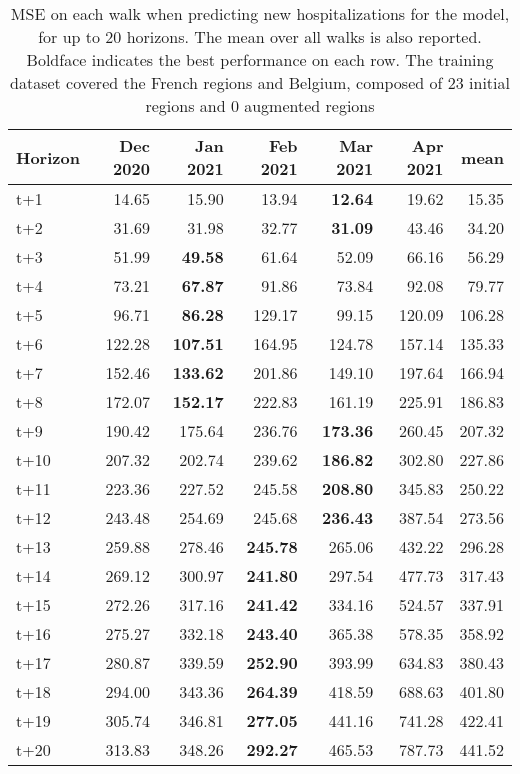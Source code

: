 \begin{table}[H]
\centering
\caption{MSE on each walk when predicting new hospitalizations for the model, for up to 20 horizons. The mean over all walks is also reported. Boldface indicates the best performance on each row. The training dataset covered the French regions and Belgium, composed of 23 initial regions and 0 augmented regions }
\label{tab:MSE_walk_baseline}
\begin{tabular}{lrrrrrr}
\toprule
Horizon &  Dec 2020 &  Jan 2021 &  Feb 2021 &  Mar 2021 &  Apr 2021 &   mean \\
\midrule
t+1  & 14.65  & 15.90  & 13.94  & \textbf{12.64}  & 19.62  & 15.35  \\
t+2  & 31.69  & 31.98  & 32.77  & \textbf{31.09}  & 43.46  & 34.20  \\
t+3  & 51.99  & \textbf{49.58}  & 61.64  & 52.09  & 66.16  & 56.29  \\
t+4  & 73.21  & \textbf{67.87}  & 91.86  & 73.84  & 92.08  & 79.77  \\
t+5  & 96.71  & \textbf{86.28}  & 129.17  & 99.15  & 120.09  & 106.28  \\
t+6  & 122.28  & \textbf{107.51}  & 164.95  & 124.78  & 157.14  & 135.33  \\
t+7  & 152.46  & \textbf{133.62}  & 201.86  & 149.10  & 197.64  & 166.94  \\
t+8  & 172.07  & \textbf{152.17}  & 222.83  & 161.19  & 225.91  & 186.83  \\
t+9  & 190.42  & 175.64  & 236.76  & \textbf{173.36}  & 260.45  & 207.32  \\
t+10  & 207.32  & 202.74  & 239.62  & \textbf{186.82}  & 302.80  & 227.86  \\
t+11  & 223.36  & 227.52  & 245.58  & \textbf{208.80}  & 345.83  & 250.22  \\
t+12  & 243.48  & 254.69  & 245.68  & \textbf{236.43}  & 387.54  & 273.56  \\
t+13  & 259.88  & 278.46  & \textbf{245.78}  & 265.06  & 432.22  & 296.28  \\
t+14  & 269.12  & 300.97  & \textbf{241.80}  & 297.54  & 477.73  & 317.43  \\
t+15  & 272.26  & 317.16  & \textbf{241.42}  & 334.16  & 524.57  & 337.91  \\
t+16  & 275.27  & 332.18  & \textbf{243.40}  & 365.38  & 578.35  & 358.92  \\
t+17  & 280.87  & 339.59  & \textbf{252.90}  & 393.99  & 634.83  & 380.43  \\
t+18  & 294.00  & 343.36  & \textbf{264.39}  & 418.59  & 688.63  & 401.80  \\
t+19  & 305.74  & 346.81  & \textbf{277.05}  & 441.16  & 741.28  & 422.41  \\
t+20  & 313.83  & 348.26  & \textbf{292.27}  & 465.53  & 787.73  & 441.52  \\

\bottomrule
\end{tabular}
\end{table}
